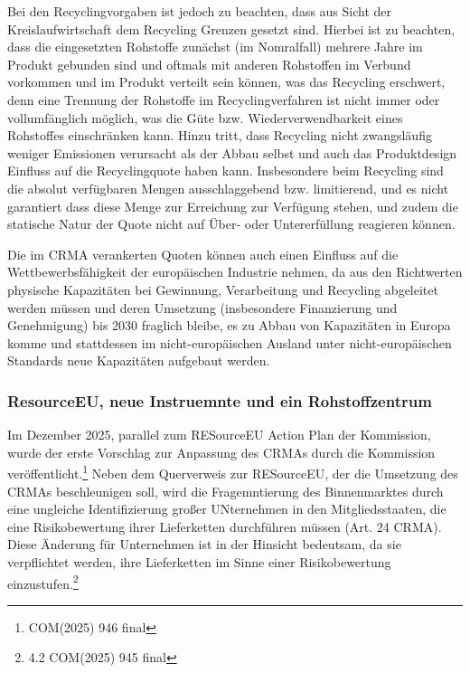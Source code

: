 \documentclass[12pt,a4paper,oneside]{book} %
\begin{document}
Bei den Recyclingvorgaben ist jedoch zu beachten, dass aus Sicht der Kreislaufwirtschaft dem Recycling Grenzen gesetzt sind. Hierbei ist zu beachten, dass die eingesetzten Rohstoffe zunächst (im Nomralfall) mehrere Jahre im Produkt gebunden sind und oftmals mit anderen Rohstoffen im Verbund vorkommen und im Produkt verteilt sein können, was das Recycling erschwert, denn eine Trennung der Rohstoffe im Recyclingverfahren ist nicht immer oder vollumfänglich möglich, was die Güte bzw. Wiederverwendbarkeit eines Rohstoffes einschränken kann.\autocite{Frenz 2025, S. 80} Hinzu tritt, dass Recycling nicht zwangsläufig weniger Emissionen verursacht als der Abbau selbst und auch das Produktdesign Einfluss auf die Recyclingquote haben kann.\autocites{Schmidt, Schäfer, Rötzer, Primär- und Sekundärmetalle und ihre Klimarelevanz, 2020, 3-16}{Fremz 2025, S. 80} Insbesondere beim Recycling sind die absolut verfügbaren Mengen ausschlaggebend bzw. limitierend,\autocite{Frenz 2025, S. 1099} und es nicht garantiert dass diese Menge zur Erreichung zur Verfügung stehen,\autocite{CITATIONNEEDED} und zudem die statische Natur der Quote nicht auf Über- oder Untererfüllung reagieren können.\autocite{Frenz 2025, S. 1099}

Die im CRMA verankerten Quoten können auch einen Einfluss auf die Wettbewerbsfähigkeit der europäischen Industrie nehmen, da aus den Richtwerten physische Kapazitäten bei Gewinnung, Verarbeitung und Recycling abgeleitet werden müssen und deren Umsetzung (insbesondere Finanzierung und Genehmigung) bis 2030 fraglich bleibe, es zu Abbau von Kapazitäten in Europa komme und stattdessen im nicht-europäischen Ausland unter nicht-europäischen Standards neue Kapazitäten aufgebaut werden.\autocite{Frenz 2025, S. 1099}

\subsubsection{ResourceEU, neue Instruemnte und ein Rohstoffzentrum}

Im Dezember 2025, parallel zum RESourceEU Action Plan der Kommission, wurde der erste Vorschlag zur Anpassung des CRMAs durch die Kommission veröffentlicht.\footnote{COM(2025) 946 final} Neben dem Querverweis zur RESourceEU, der die Umsetzung des CRMAs beschleunigen soll, wird die Fragemntierung des Binnenmarktes durch eine ungleiche Identifizierung großer UNternehmen in den Mitgliedsstaaten, die eine Risikobewertung ihrer Lieferketten durchführen müssen (Art. 24 CRMA). Diese Änderung für Unternehmen ist in der Hinsicht bedeutsam, da sie verpflichtet werden, ihre Lieferketten im Sinne einer Risikobewertung einzustufen.\footnote{4.2 COM(2025) 945 final}
\end{document}
